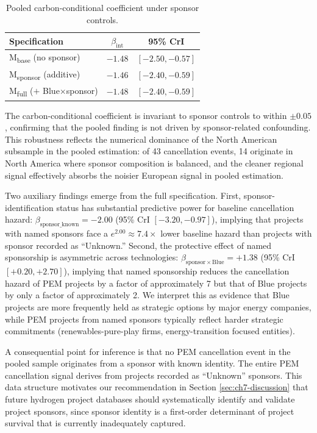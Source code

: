 \documentclass[11pt,a4paper]{article}
\newcommand{\bint}{\beta_{\mathrm{int}}}
\begin{document}
\begin{table}[h!]
\centering
\caption{Pooled carbon-conditional coefficient under sponsor controls.}
\begin{tabular}{lcc}
\toprule
Specification & $\bint$ & 95\% CrI \\
\midrule
M\textsubscript{base} (no sponsor) & $-1.48$ & $[-2.50, -0.57]$ \\
M\textsubscript{sponsor} (additive) & $-1.46$ & $[-2.40, -0.59]$ \\
M\textsubscript{full} ($+$ Blue$\times$sponsor) & $-1.48$ & $[-2.40, -0.59]$ \\
\bottomrule
\end{tabular}
\label{tab:ch7-pooled-sponsor}
\end{table}

The carbon-conditional coefficient is invariant to sponsor controls to within $\pm 0.05$, confirming that the pooled finding is not driven by sponsor-related confounding. This robustness reflects the numerical dominance of the North American subsample in the pooled estimation: of 43 cancellation events, 14 originate in North America where sponsor composition is balanced, and the cleaner regional signal effectively absorbs the noisier European signal in pooled estimation.

Two auxiliary findings emerge from the full specification. First, sponsor-identification status has substantial predictive power for baseline cancellation hazard: $\beta_{\mathrm{sponsor\_known}} = -2.00$ (95\% CrI $[-3.20, -0.97]$), implying that projects with named sponsors face a $e^{2.00} \approx 7.4\times$ lower baseline hazard than projects with sponsor recorded as ``Unknown.'' Second, the protective effect of named sponsorship is asymmetric across technologies: $\beta_{\mathrm{sponsor} \times \mathrm{Blue}} = +1.38$ (95\% CrI $[+0.20, +2.70]$), implying that named sponsorship reduces the cancellation hazard of PEM projects by a factor of approximately 7 but that of Blue projects by only a factor of approximately 2. We interpret this as evidence that Blue projects are more frequently held as strategic options by major energy companies, while PEM projects from named sponsors typically reflect harder strategic commitments (renewables-pure-play firms, energy-transition focused entities).

A consequential point for inference is that no PEM cancellation event in the pooled sample originates from a sponsor with known identity. The entire PEM cancellation signal derives from projects recorded as ``Unknown'' sponsors. This data structure motivates our recommendation in Section \ref{sec:ch7-discussion} that future hydrogen project databases should systematically identify and validate project sponsors, since sponsor identity is a first-order determinant of project survival that is currently inadequately captured.
\end{document}
